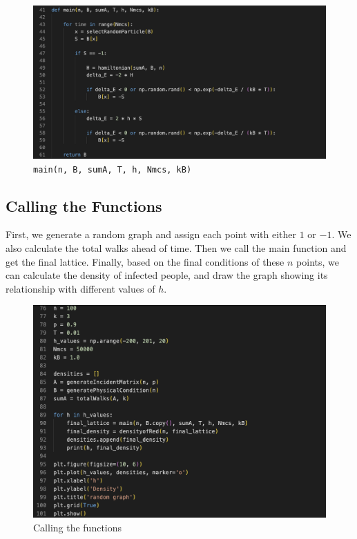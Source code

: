 \documentclass[11pt]{book}
\begin{document}
\begin{figure}
    \centering
    \includegraphics[width=1\linewidth]{rg_main.png}
    \caption{\texttt{main(n, B, sumA, T, h, Nmcs, kB)}}
    \label{fig53}
\end{figure}

\subsection{Calling the Functions}
First, we generate a random graph and assign each point with either $1$ or $-1$. We also calculate the total walks ahead of time. Then we call the main function and get the final lattice. Finally, based on the final conditions of these $n$ points, we can calculate the density of infected people, and draw the graph showing its relationship with different values of $h$.

\begin{figure}
    \centering
    \includegraphics[width=1\linewidth]{rg_callingtheFunctions.png}
    \caption{Calling the functions}
    \label{fig54}
\end{figure}
\end{document}
